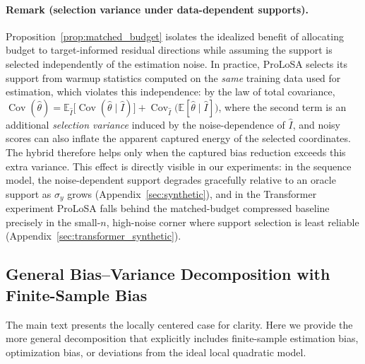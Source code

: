 \paragraph{Remark (selection variance under data-dependent supports).}
Proposition~\ref{prop:matched_budget} isolates the idealized benefit of allocating budget to target-informed residual directions while assuming the support is selected independently of the estimation noise.
In practice, ProLoSA selects its support from warmup statistics computed on the \emph{same} training data used for estimation, which violates this independence: by the law of total covariance,
$\operatorname{Cov}(\hat\theta)=\mathbb E_{\hat I}\big[\operatorname{Cov}(\hat\theta\mid\hat I)\big]+\operatorname{Cov}_{\hat I}\big(\mathbb E[\hat\theta\mid\hat I]\big)$,
where the second term is an additional \emph{selection variance} induced by the noise-dependence of $\hat I$, and noisy scores can also inflate the apparent captured energy of the selected coordinates.
The hybrid therefore helps only when the captured bias reduction exceeds this extra variance.
This effect is directly visible in our experiments: in the sequence model, the noise-dependent support degrades gracefully relative to an oracle support as $\sigma_y$ grows (Appendix~\ref{sec:synthetic}), and in the Transformer experiment ProLoSA falls behind the matched-budget compressed baseline precisely in the small-$n$, high-noise corner where support selection is least reliable (Appendix~\ref{sec:transformer_synthetic}).


\subsection{General Bias--Variance Decomposition with Finite-Sample Bias}
\label{app:general_bias_variance}

The main text presents the locally centered case for clarity.
Here we provide the more general decomposition that explicitly includes finite-sample estimation bias, optimization bias, or deviations from the ideal local quadratic model.

